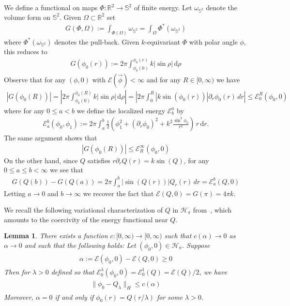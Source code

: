 \documentclass[10pt,reqno]{amsart}
\newcommand{\E}{\mathcal{E}}
\newcommand{\HH}{\mathcal{H}}
\newcommand{\R}{\mathbb{R}}
\newcommand{\Sp}{\mathbb{S}}
\newcommand{\al}{\alpha}
\newcommand{\om}{\omega}
\newcommand{\la}{\lambda}
\newcommand{\Om}{\Omega}
\newcommand{\p}{\partial}
\newcommand{\abs}[1]{\left\lvert{#1}\right\rvert}
\newcommand{\ant}[1]{\begin{align*}\begin{split} #1 \end{split}\end{align*}}
\newcommand{\EQ}[1]{\begin{equation}\begin{split} #1 \end{split}\end{equation}}
\numberwithin{equation}{section}
\newtheorem{lem}[thm]{Lemma}
\theoremstyle{remark}
\newtheorem{rem}[thm]{Remark}
\newcommand{\ud}{\mathrm{d}}
\newcommand{\0}{\emptyset}
\begin{document}
We define a functional on maps $\Phi: \R^2 \to \Sp^2$ of finite energy. Let $\om_{\Sp^2}$ denote the volume form on $\Sp^2$.  Given $\Om  \subset \R^2$ set 
\EQ{
G( \Phi, \Om):=  \int_{\Phi(\Om)} \om_{\Sp^2} =  \int_{\Om} \Phi^*(\om_{\Sp^2}) 
}
where $\Phi^*(\om_{\Sp^2})$ denotes the pull-back. Given $k$-equivariant $\Phi$ with polar angle $\phi$, this reduces to 
\EQ{
G(\phi_0(r)):= 2 \pi  \int_{\phi_0(0)}^{\phi_0(r)}k \abs{\sin \rho} \, \ud\rho
}
Observe that for any $(\phi, 0)$ with $\E(\vec \phi)< \infty$  and for any $R \in[0, \infty)$ we have 
\EQ{\label{b R}
\abs{G(\phi_0(R))}    =\abs{2 \pi \int_{\phi_0(0)}^{\phi_0(R)} k\abs{\sin \rho} \, \ud\rho} 
= \abs{2 \pi \int_0^R \abs{k\sin(\phi_0(r))} \p_r\phi_0(r) \, dr}
 \le \E_0^R(\phi_0, 0)
}
where for any $0 \le a <b$ we define the localized energy $\E^a_b$ by
\EQ{
\E_a^b( \phi_0, \phi_1) := 2 \pi \int_a^b \frac{1}{2} \left(\phi_1^2 + ( \p_r \phi_0)^2 + k^2 \frac{\sin^2 \phi_0}{ r^2} \right) \, r \, \ud r. 
}
The same argument shows that 
\EQ{ \label{a R} 
\abs{G(\phi_0(R))} \le  \E_R^{\infty}(\phi_0, 0)
}
On the other hand, since  $Q$ satisfies $r \p_r Q(r) = k\sin(Q)$,  for any $0\le a\le  b < \infty$ we see that 
\EQ{\label{eq:GQ}
G(Q(b))-G(Q(a)) = 2 \pi \int_{a}^{b} \abs{\sin(Q(r))} Q_r(r) \, dr =  \E_a^b(Q, 0)
}
Letting $a \to 0$ and $b \to \infty$ we recover the fact that $\E(Q, 0) = G(\pi) = 4 \pi k $. 



We recall the following variational characterization of $Q$ in  $\HH_\pi$ from~\cite{Cote}, which amounts to the coercivity of the energy functional near $Q$. 

\begin{lem}\emph{\cite[Proposition $2.3$]{Cote}}\label{l:decQ} There exists a function $c: [0, \infty) \to [0, \infty)$ such that $c(\al) \to 0$ as  $\al \to 0$ and such that the following holds: Let  $( \phi_0, 0) \in \HH_\pi$. Suppose 
\ant{
\alpha :=\E( \phi_0, 0)- \E(Q, 0) \ge 0
}
Then for $\la>0$ defined so that  $\E_0^{\la}(\phi_0, 0) = \E_0^1(Q)= \E(Q)/2$, we have 
\ant{
\|\phi_0 - Q_\la\|_{H} \le c(\alpha)
}
Moreover,  $\al = 0$ if and only if $\phi_0(r)  = Q(r/ \la)$ for some $\la>0$. 
\end{lem}

\end{document}
